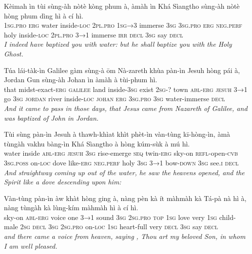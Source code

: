 \documentclass[11pt,a4paper]{article}
\begin{document}
\begin{exe}
\gll Kèimah ìn tùi sùng-àh nòtè kòng phum à, àmàh ìn Khá Sìangtho sùng-àh nòtè hòng phum dìng hì à cí hì. \\
     \textsc{1sg}.\textsc{pro} \textsc{erg} water inside-\textsc{loc} \textsc{2pl}.\textsc{pro} \textsc{1sg→3} immerse \textsc{3sg} \textsc{3sg}.\textsc{pro} \textsc{erg} \textsc{neg}.\textsc{perf} holy inside-\textsc{loc} \textsc{2pl}.\textsc{pro} \textsc{3→1} immerse \textsc{irr} \textsc{decl} \textsc{3sg} say \textsc{decl} \\
\glt \textcolor{kjvcolor}{\textit{I indeed have baptized you with water: but he shall baptize you with the Holy Ghost.}}

\gll Túa lái-tàk-ìn Galilee gàm sùng-à ōm Nà-zareth khùa pàn-ìn Jesuh hòng pái à, Jordan Gun sùng-àh Johan ìn àmàh à tùi-phum hì. \\
     that midst-exact-\textsc{erg} \textsc{galilee} land inside-\textsc{3sg} exist \textsc{2sg}-? town \textsc{abl}-\textsc{erg} \textsc{jesuh} \textsc{3→1} go \textsc{3sg} \textsc{jordan} river inside-\textsc{loc} \textsc{johan} \textsc{erg} \textsc{3sg}.\textsc{pro} \textsc{3sg} water-immerse \textsc{decl} \\
\glt \textcolor{kjvcolor}{\textit{And it came to pass in those days, that Jesus came from Nazareth of Galilee, and was baptized of John in Jordan.}}

\gll Tùi sùng pàn-ìn Jesuh à thawh-khìat khìt phèt-ìn vàn-tùng kī-hòng-ìn, àmà tùngàh vakhu bàng-ìn Khá Sìangtho à hòng kúm-sùk à mú hì. \\
     water inside \textsc{abl}-\textsc{erg} \textsc{jesuh} \textsc{3sg} rise-emerge \textsc{seq} twin-\textsc{erg} sky-on \textsc{refl}-open-\textsc{cvb} \textsc{3sg}.\textsc{poss} on-\textsc{loc} dove like-\textsc{erg} \textsc{neg}.\textsc{perf} holy \textsc{3sg} \textsc{3→1} bow-\textsc{down} \textsc{3sg} see.\textsc{i} \textsc{decl} \\
\glt \textcolor{kjvcolor}{\textit{And straightway coming up out of the water, he saw the heavens opened, and the Spirit like a dove descending upon him:}}

\gll Vàn-tùng pàn-ìn àw khàt hòng ging à, nàng pèn kà ít màhmàh kà Tá-pà nà hì à, nàng tùngàh kà lùng-kím màhmàh hì à cí hì. \\
     sky-on \textsc{abl}-\textsc{erg} voice one \textsc{3→1} sound \textsc{3sg} \textsc{2sg}.\textsc{pro} \textsc{top} \textsc{1sg} love very \textsc{1sg} child-male \textsc{2sg} \textsc{decl} \textsc{3sg} \textsc{2sg}.\textsc{pro} on-\textsc{loc} \textsc{1sg} heart-full very \textsc{decl} \textsc{3sg} say \textsc{decl} \\
\glt \textcolor{kjvcolor}{\textit{and there came a voice from heaven, saying , Thou art my beloved Son, in whom I am well pleased.}}


\end{exe}
\end{document}
